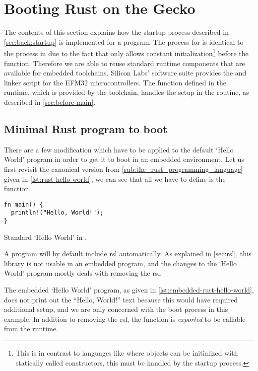 \section{Booting Rust on the Gecko}
\label{sec:impl:booting}

The contents of this section explains how the startup process described in \autoref{sec:back:startup} is implemented for a {\rust} program.
The process for {\rust} is identical to the process in {\C} due to the fact that {\rust} only allows constant initialization\footnote{This is in contrast to languages like {\Cpp} where objects can be initialized with statically called constructors, this must be handled by the startup process.} before the {\main} function.
Therefore we are able to reuse standard runtime components that are available for {\C} embedded toolchains.
Silicon Labs' software suite provides the  and linker script for the EFM32 microcontrollers.
The  function defined in the {\C} runtime, which is provided by the {\armgcc} toolchain, handles the setup in the  routine, as described in \autoref{sec:before-main}.

\subsection{Minimal Rust program to boot}
\label{ssec:minimal_rust_program_to_boot}

There are a few modification which have to be applied to the default `Hello World' program in order to get it to boot in an embedded environment.
Let us first revisit the canonical version from \autoref{sub:the_rust_programming_language} given in \autoref{lst:rust-hello-world}, we can see that all we have to define is the  function.

\begin{listing}[H]
  \begin{verbatim}
fn main() {
  println!("Hello, World!");
}
  \end{verbatim}
  \caption{Standard `Hello World' in {\rust}.}
  \label{lst:rust-hello-world}
\end{listing}

A {\rust} program will by default include \gls{rsl} automatically.
As explained in \autoref{sec:rsl}, this library is not usable in an embedded program, and the changes to the `Hello World' program mostly deals with removing the \gls{rsl}.

The embedded `Hello World' program, as given in \autoref{lst:embedded-rust-hello-world}, does not print out the ``Hello, World!'' text because this would have required additional setup, and we are only concerned with the boot process in this example.
In addition to removing the \gls{rsl}, the {\main} function is \emph{exported} to be callable from the {\C} runtime.

